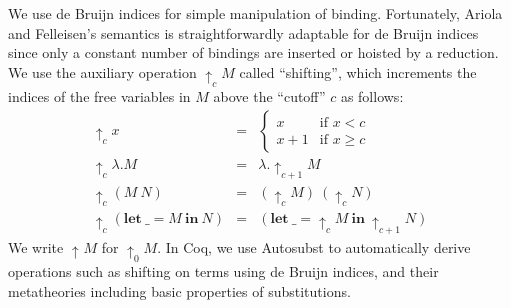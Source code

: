 \documentclass[english]{sumiilab-paper}
\newcommand{\LET}[3]{\mathbf{let}~#1=#2~\mathbf{in}~#3}
\newcommand{\SHIFT}[2]{{\uparrow_{#1}}#2}
\begin{document}
We use de Bruijn indices for simple manipulation of binding.
Fortunately, Ariola and Felleisen's semantics is straightforwardly adaptable for de Bruijn indices
since only a constant number of bindings are inserted or hoisted by a reduction.
We use the auxiliary operation $\SHIFT{c}{M}$ called ``shifting'',
which increments the indices of the free variables in $M$ above the ``cutoff'' $c$ as follows:
\[\begin{array}{rcl}
	\SHIFT{c}{x} & = &
		\begin{cases}
			x & \text{if $x < c$} \\
			x + 1 & \text{if $x \geq c$}
		\end{cases} \\
	\SHIFT{c}{\lambda.M} & = & \lambda. \SHIFT{c + 1}{M} \\
	\SHIFT{c}{(M~N)} & = & (\SHIFT{c}{M})~(\SHIFT{c}{N}) \\
	\SHIFT{c}{(\LET{\_}{M}{N})} & = & (\LET{\_}{\SHIFT{c}{M}}{\SHIFT{c+1}{N}})
\end{array} \]
We write $\SHIFT{{}}{M}$ for $\SHIFT{0}{M}$.
In Coq, we use Autosubst \cite{Schaefer15} to automatically derive operations such as shifting on terms using de Bruijn indices, and their metatheories including basic properties of substitutions.
\end{document}

